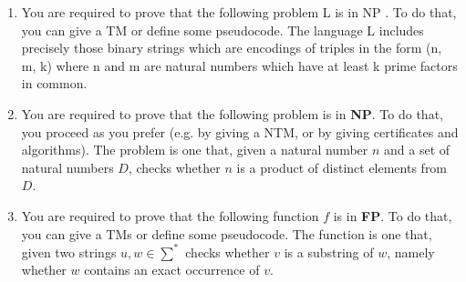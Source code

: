 \documentclass{article}
\begin{document}
\begin{enumerate}[label=\textbf{\arabic*.}, leftmargin=*]
				(2) You are required to prove that the following problem $\mathcal{L}$ is in \textbf{NP}. To do that, you can give a TM or define some pseudocode. The language $\mathcal{L}$ includes precisely those binary strings which are encodings of pairs in the form $(G, k)$ where $G$ is a graph and $k$ is a natural number, such that the nodes of $G$ can be assigned a natural number between $1$ and $k$ in such a way that nodes which are linked by an edge are assigned distinct natural numbers.
				\begin{pane}
					\begin{center}
						$\mathcal{L} = \{(G, k) \; \vert$ Exist C.(number of different values in $C < k$ and (for every $(v, u)$ that are edges $C[v] != C[u]$))$\}$.
					\end{center}
					Given that this is in the form `certificate-verifier' what we need to do to prove that this problem is in NP is to show that the certificate has polynomial size and that M runs in polynomial time.
					\begin{enumerate}[label=\arabic*., leftmargin=*]
						\item The certificate $C$ has size bounded by the graph $G$ and thus is polynomial.
						\item It's enough to check whether any pair have different value (given that they're connected by an edge). This can be done in quadratic time and thus M runs in polynomial time.
					\end{enumerate}
				\end{pane}
				\item You are required to prove that the following problem L is in NP . To do that, you can give a TM or define some pseudocode. The language L includes precisely those binary strings which are encodings of triples in the form (n, m, k) where n and m are natural numbers which have at least k prime factors in common.
				\begin{pane}
						
				\end{pane}
				\item You are required to prove that the following problem is in \textbf{NP}. To do that, you proceed as you prefer (e.g. by giving a NTM, or by giving certificates and algorithms). The problem is one that, given a natural number $n$ and a set of natural numbers $D$, checks whether $n$ is a product of distinct elements from $D$.
				\begin{pane}
						
				\end{pane}
				\item You are required to prove that the following function $f$ is in \textbf{FP}. To do that, you can give a TMs or define some pseudocode. The function is one that, given two strings $u, w \in \sum^*$ checks whether $v$ is a substring of $w$, namely whether $w$ contains an exact occurrence of $v$.
				\begin{pane}
						

\end{pane}
\end{enumerate}
\end{document}
